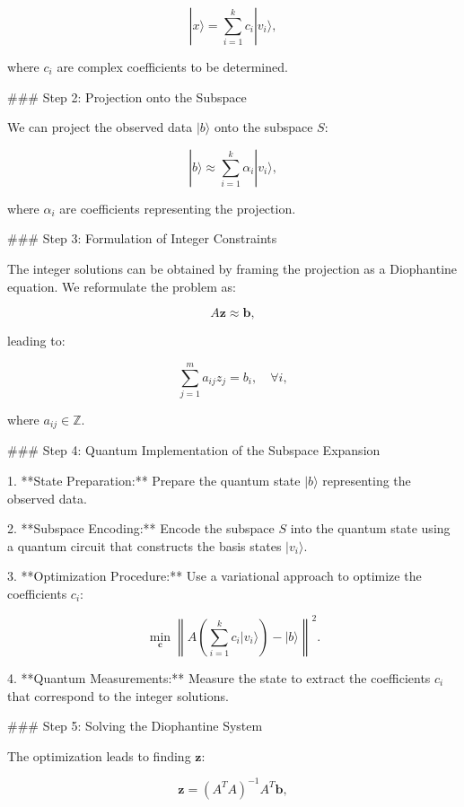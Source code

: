 \documentclass{article}
\begin{document}
\[
|x\rangle = \sum_{i=1}^{k} c_i |v_i\rangle,
\]

where \( c_i \) are complex coefficients to be determined.

### Step 2: Projection onto the Subspace

We can project the observed data \( |b\rangle \) onto the subspace \( S \):

\begin{equation}
|b\rangle \approx \sum_{i=1}^{k} \alpha_i |v_i\rangle,
\end{equation}

where \( \alpha_i \) are coefficients representing the projection.

### Step 3: Formulation of Integer Constraints

The integer solutions can be obtained by framing the projection as a Diophantine equation. We reformulate the problem as:

\begin{equation}
A \mathbf{z} \approx \mathbf{b},
\end{equation}

leading to:

\[
\sum_{j=1}^{m} a_{ij} z_j = b_i, \quad \forall i,
\]

where \( a_{ij} \in \mathbb{Z} \).

### Step 4: Quantum Implementation of the Subspace Expansion

1. **State Preparation:** Prepare the quantum state \( |b\rangle \) representing the observed data.

2. **Subspace Encoding:** Encode the subspace \( S \) into the quantum state using a quantum circuit that constructs the basis states \( |v_i\rangle \).

3. **Optimization Procedure:** Use a variational approach to optimize the coefficients \( c_i \):

\begin{equation}
\min_{\mathbf{c}} \left\| A\left(\sum_{i=1}^{k} c_i |v_i\rangle\right) - |b\rangle \right\|^2.
\end{equation}

4. **Quantum Measurements:** Measure the state to extract the coefficients \( c_i \) that correspond to the integer solutions.

### Step 5: Solving the Diophantine System

The optimization leads to finding \( \mathbf{z} \):

\begin{equation}
\mathbf{z} = \left( A^T A \right)^{-1} A^T \mathbf{b},
\end{equation}
\end{document}
